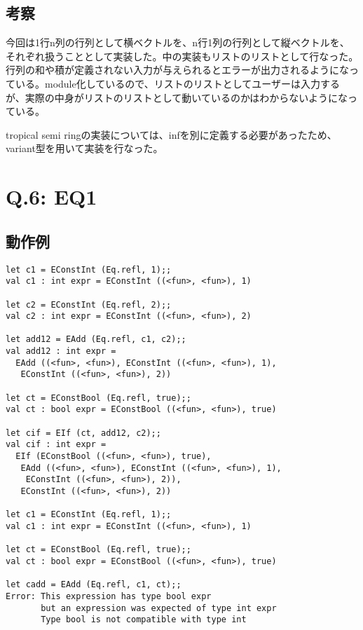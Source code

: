 \documentclass[uplatex,12pt]{jsarticle}
\begin{document}
\vspace{12pt}
\subsection{考察}

今回は1行n列の行列として横ベクトルを、n行1列の行列として縦ベクトルを、それぞれ扱うこととして実装した。中の実装もリストのリストとして行なった。行列の和や積が定義されない入力が与えられるとエラーが出力されるようになっている。module化しているので、リストのリストとしてユーザーは入力するが、実際の中身がリストのリストとして動いているのかはわからないようになっている。

tropical semi ringの実装については、infを別に定義する必要があったため、variant型を用いて実装を行なった。

\section{Q.6: EQ1}
\subsection{動作例}

\begin{lstlisting}[caption=EQ1の出力]
let c1 = EConstInt (Eq.refl, 1);;
val c1 : int expr = EConstInt ((<fun>, <fun>), 1)

let c2 = EConstInt (Eq.refl, 2);;
val c2 : int expr = EConstInt ((<fun>, <fun>), 2)

let add12 = EAdd (Eq.refl, c1, c2);;
val add12 : int expr =
  EAdd ((<fun>, <fun>), EConstInt ((<fun>, <fun>), 1),
   EConstInt ((<fun>, <fun>), 2))

let ct = EConstBool (Eq.refl, true);;
val ct : bool expr = EConstBool ((<fun>, <fun>), true)

let cif = EIf (ct, add12, c2);;
val cif : int expr =
  EIf (EConstBool ((<fun>, <fun>), true),
   EAdd ((<fun>, <fun>), EConstInt ((<fun>, <fun>), 1),
    EConstInt ((<fun>, <fun>), 2)),
   EConstInt ((<fun>, <fun>), 2))

let c1 = EConstInt (Eq.refl, 1);;
val c1 : int expr = EConstInt ((<fun>, <fun>), 1)

let ct = EConstBool (Eq.refl, true);;
val ct : bool expr = EConstBool ((<fun>, <fun>), true)

let cadd = EAdd (Eq.refl, c1, ct);;
Error: This expression has type bool expr
       but an expression was expected of type int expr
       Type bool is not compatible with type int
\end{lstlisting}
\end{document}
